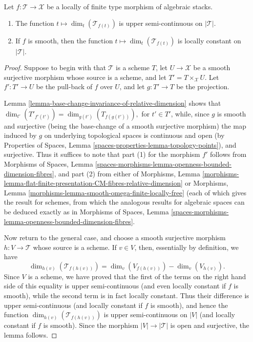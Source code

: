 \begin{lemma}
\label{lemma-relative-dimension-is-semi-continuous}
Let $f: \mathcal{T} \to \mathcal{X}$ be a locally of finite type morphism of
algebraic stacks.
\begin{enumerate}
\item
The function $t \mapsto \dim_t(\mathcal{T}_{f(t)})$ is upper semi-continuous
on $|\mathcal{T}|$.
\item If $f$ is smooth, then
the function $t \mapsto \dim_t(\mathcal{T}_{f(t)})$ is locally constant
on $|\mathcal{T}|$.
\end{enumerate}
\end{lemma}

\begin{proof}
Suppose to begin with that $\mathcal{T}$ is a scheme $T$,
let $U \to \mathcal{X}$ be a smooth surjective morphism whose source
is a scheme, and let $T' = T \times_{\mathcal{X}} U$.
Let $f': T' \to U$ be the pull-back of $f$ over $U$,
and let $g: T' \to T$ be the projection.

\medskip\noindent
Lemma \ref{lemma-base-change-invariance-of-relative-dimension}
shows that $\dim_{t'}(T'_{f'(t')}) = \dim_{g(t')}(T_{f(g(t'))}),$
for $t' \in T'$, while,
since $g$ is smooth and surjective (being the base-change
of a smooth surjective morphism) the map induced by $g$ on underlying
topological spaces is continuous and open
(by
Properties of Spaces, Lemma \ref{spaces-properties-lemma-topology-points}), and
surjective. Thus it suffices to note that part (1) for the morphism $f'$
follows from
Morphisms of Spaces, Lemma
\ref{spaces-morphisms-lemma-openness-bounded-dimension-fibres}, and part (2)
from either of Morphisms, Lemma
\ref{morphisms-lemma-flat-finite-presentation-CM-fibres-relative-dimension}
or
Morphisms, Lemma \ref{morphisms-lemma-smooth-omega-finite-locally-free}
(each of which gives the result for schemes, from which
the analogous results for algebraic spaces can
be deduced exactly as in
Morphisms of Spaces, Lemma
\ref{spaces-morphisms-lemma-openness-bounded-dimension-fibres}.

\medskip\noindent
Now return to the general case,
and choose a smooth surjective morphism
$h:V \to \mathcal{T}$ whose source is a scheme.
If $v \in V$, then, essentially by definition,
we have
$$
\dim_{h(v)}(\mathcal{T}_{f(h(v))}) =
\dim_{v}(V_{f(h(v))}) - \dim_{v}(V_{h(v)}).
$$
Since $V$ is a scheme, we have proved that the first
of the terms on the right hand side of this equality
is upper semi-continuous (and even locally
constant if $f$ is smooth), while the second term is
in fact locally constant.
Thus their difference is upper semi-continuous
(and locally constant if $f$ is smooth),
and hence the function
$\dim_{h(v)}(\mathcal{T}_{f(h(v))})$
is upper semi-continuous on $|V|$ (and locally
constant if $f$ is smooth).
Since the morphism $|V| \to |\mathcal{T}|$ is open and surjective,
the lemma follows.
\end{proof}

